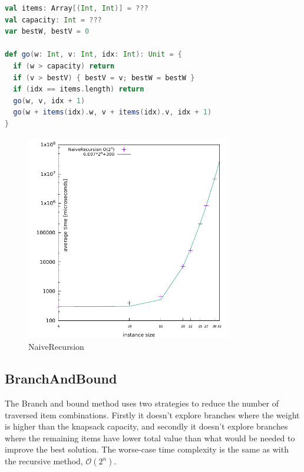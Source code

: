 \documentclass[a4paper,10pt,twocolumn]{article}
\begin{document}
\begin{lstlisting}[frame=tlrb,language=scala,basicstyle=\scriptsize,label=naiveRecursionCode,caption=NaiveRecursion]
val items: Array[(Int, Int)] = ???
val capacity: Int = ???
var bestW, bestV = 0

def go(w: Int, v: Int, idx: Int): Unit = {
  if (w > capacity) return
  if (v > bestV) { bestV = v; bestW = bestW }
  if (idx == items.length) return
  go(w, v, idx + 1)
  go(w + items(idx).w, v + items(idx).v, idx + 1)
}
\end{lstlisting}

\begin{figure}[H]
  \begin{center}
        \hspace*{-1.2cm}\includegraphics[width=9cm,height=9cm]{gnuplot/pdf/NaiveRecursion.pdf}
  \end{center}
  \caption{NaiveRecursion}\label{fig1}
\end{figure}

\subsection{BranchAndBound}
The Branch and bound method uses two strategies to reduce the number of traversed item combinations. Firstly it doesn't
explore branches where the weight is higher than the knapsack capacity, and secondly it doesn't explore branches where
the remaining items have lower total value than what would be needed to improve the best solution. The worse-case time
complexity is the same as with the recursive method, $\mathcal{O}(2^n)$.
\end{document}
